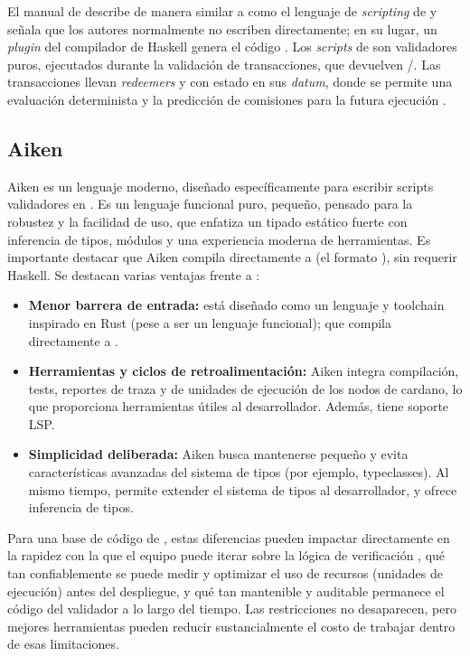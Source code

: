 El manual de \eUTxO \cite{eutxo_handbook_2022} describe de manera similar a \Plutus como el lenguaje de \textit{scripting} de \Cardano y señala que los autores normalmente no escriben \Plutus directamente; en su lugar, un \textit{plugin} del compilador de Haskell genera el código \Onchain. Los \textit{scripts} de \Plutus son validadores puros, ejecutados durante la validación de transacciones, que devuelven \True/\False. Las transacciones llevan \textit{redeemers} y \UTxOs con estado en sus \textit{datum}, donde se permite una evaluación determinista y la predicción de comisiones para la futura ejecución \Onchain.

\subsection{Aiken}
\label{subsec:motivation-aiken}

Aiken \cite{aiken2026} es un lenguaje moderno, diseñado específicamente para escribir scripts validadores en \Cardano. Es un lenguaje funcional puro, pequeño, pensado para la robustez y la facilidad de uso, que enfatiza un tipado estático fuerte con inferencia de tipos, módulos y una experiencia moderna de herramientas. Es importante destacar que Aiken compila directamente a \UPLC (el formato \Onchain), sin requerir Haskell. Se destacan varias ventajas frente a \Plutus:

\begin{itemize}[noitemsep]
	\item \textbf{Menor barrera de entrada:} está diseñado como un lenguaje y toolchain inspirado en Rust (pese a ser un lenguaje funcional); que compila directamente a \UPLC.
	\item \textbf{Herramientas y ciclos de retroalimentación:} Aiken integra compilación, tests, reportes de traza y de unidades de ejecución de los nodos de cardano, lo que proporciona herramientas útiles al desarrollador. Además, tiene soporte LSP.
	\item \textbf{Simplicidad deliberada:} Aiken busca mantenerse pequeño y evita características avanzadas del sistema de tipos (por ejemplo, typeclasses). Al mismo tiempo, permite extender el sistema de tipos al desarrollador, y ofrece inferencia de tipos.
\end{itemize}

Para una base de código de \zkBridge, estas diferencias pueden impactar directamente en la rapidez con la que el equipo puede iterar sobre la lógica de verificación \Onchain, qué tan confiablemente se puede medir y optimizar el uso de recursos (unidades de ejecución) antes del despliegue, y qué tan mantenible y auditable permanece el código del validador a lo largo del tiempo. Las restricciones \Onchain no desaparecen, pero mejores herramientas pueden reducir sustancialmente el costo de trabajar dentro de esas limitaciones.

